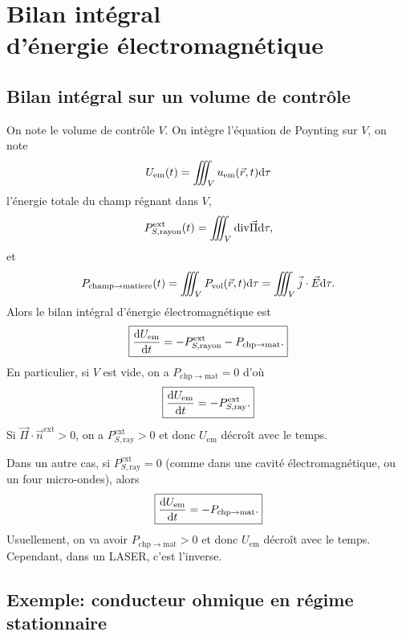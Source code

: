 \section{Bilan intégral\texorpdfstring{\\}{ }d'énergie électromagnétique}
\subsection{Bilan intégral sur un volume de contrôle}

On note le volume de contrôle $V$. On intègre l'équation de Poynting sur $V$, on note 
\begin{equation}
    U_{\mathrm{em}}(t)=\iiint_{V}u_{\mathrm{em}}(\vec{r},t)\mathrm{d}\tau
\end{equation}
l'énergie totale du champ régnant dans $V$,
\begin{equation}
    P_{S,\mathrm{rayon}}^{\mathrm{ext}}(t)=\iiint_{V}\mathrm{div}\vec{\Pi}\mathrm{d}\tau,
\end{equation}
et
\begin{equation}
    P_{\mathrm{champ}\to\mathrm{matiere}}(t)=\iiint_{V}P_{\mathrm{vol}}(\vec{r},t)\mathrm{d}\tau=\iiint_{V}\vec{j}\cdot\vec{E}\mathrm{d}\tau.
\end{equation}
Alors le bilan intégral d'énergie électromagnétique est
\begin{equation}
    \boxed{
        \frac{\mathrm{d} U_{\mathrm{em}}}{\mathrm{d} t}=-P_{S,\mathrm{rayon}}^{\mathrm{ext}}-P_{\mathrm{chp}\to\mathrm{mat}}.
    }
\end{equation}
En particulier, si $V$ est vide, on a $P_{\mathrm{chp}\to\mathrm{mat}}=0$ d'où 
\begin{equation}
    \boxed{
        \frac{\mathrm{d} U_{\mathrm{em}}}{\mathrm{d} t}=-P_{S,\mathrm{ray}}^{\mathrm{ext}}.
    }
\end{equation}
Si $\vec{\Pi}\cdot\vec{n}^{\mathrm{ext}}>0$, on a $P_{S,\mathrm{ray}}^{\mathrm{ext}}>0$ et donc $U_{\mathrm{em}}$ décroît avec le temps.

Dans un autre cas, si $P_{S,\mathrm{ray}}^{\mathrm{ext}}=0$ (comme dans une cavité électromagnétique, ou un four micro-ondes), alors 
\begin{equation}
    \boxed{
        \frac{\mathrm{d} U_{\mathrm{em}}}{\mathrm{d} t}=-P_{\mathrm{chp}\to\mathrm{mat}}.
    }
\end{equation}
Usuellement, on va avoir $P_{\mathrm{chp}\to\mathrm{mat}}>0$ et donc $U_{\mathrm{em}}$ décroît avec le temps. Cependant, dans un LASER, c'est l'inverse.

\subsection{Exemple: conducteur ohmique en régime stationnaire}

